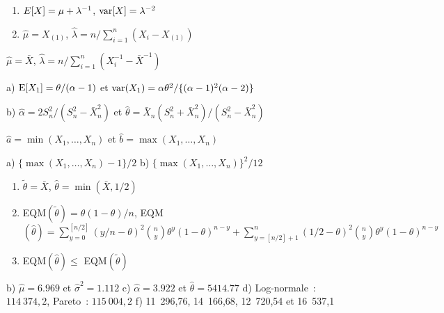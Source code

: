 \begin{reponse}{4.9}
    \begin{enumerate}
    \item $E [ X ] = \mu + \lambda^{-1}$, $\mathrm{var} [ X ] = \lambda^{-2}$
    \item $\hat{\mu} = X_{(1)}$, $\hat{\lambda} = n/\sum_{i = 1}^n (X_i -
        X_{(1)})$
    \end{enumerate}
  
\end{reponse}
\begin{reponse}{4.11}
    $\hat{\mu} = \bar{X}$, $\hat{\lambda} = n/\sum_{i = 1}^n
    (X_i^{-1} - \bar{X}^{-1})$
  
\end{reponse}
\begin{reponse}{4.12}
a) $\operatorname{E}[X_1]= \theta/(\alpha-1)$ et $
\operatorname{var}(X_1)=\alpha\theta^2/\{(\alpha-1)^2(\alpha-2)\}$

b) $\hat\alpha = 2S_n^2/(S_n^2-\bar X_n^2)$ et $\hat\theta=\bar X_n (S_n^2+\bar X_n^2)/(S_n^2-\bar X_n^2)$
\end{reponse}
\begin{reponse}{4.13}
    $\hat{a} = \min(X_1, \dots, X_n)$ et $\hat{b} = \max(X_1, \dots,
    X_n)$
  
\end{reponse}
\begin{reponse}{4.14}
a) $\{\max(X_1,\dots,X_n) -1\}/2$
b) $\{\max(X_1,\dots,X_n)\}^2/12$
\end{reponse}
\begin{reponse}{4.15}
    \begin{enumerate}
    \item $\tilde{\theta} = \bar{X}$, $\hat{\theta} =
      \min(\bar{X}, 1/2)$
    \item EQM$(\tilde{\theta}) = \theta (1 - \theta)/n$,
      EQM$(\hat{\theta}) =
      \sum_{y = 0}^{[n/2]} (y/n - \theta)^2 \binom{n}{y} \theta^y (1 -
      \theta)^{n-y} + \sum_{y = [n/2] + 1}^n (1/2 - \theta)^2
      \binom{n}{y} \theta^y (1 - \theta)^{n - y}$
    \item EQM$(\hat{\theta}) \leq$ EQM$(\tilde{\theta})$
    \end{enumerate}
  
\end{reponse}
\begin{reponse}{4.16}
b) $\hat \mu =6.969$ et $\hat\sigma^2 =1.112$
c) $\hat\alpha =3.922$ et
$\hat\theta=5414.77$
d) Log-normale~: $114~374,2$, Pareto~: $115~004,2$
f) 11~296,76,  14~166,68,  12~720,54  et  16~537,1
\end{reponse}
